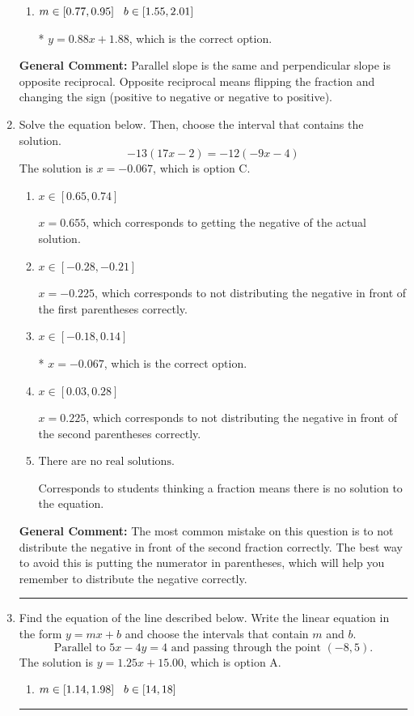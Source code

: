 \documentclass{extbook}[14pt]
\newcommand{\litem}[1]{\item #1

\rule{\textwidth}{0.4pt}}
\begin{document}
\begin{enumerate}
{\begin{enumerate}[label=\Alph*.]
 $y = -0.88x + 14.12$, which corresponds to using the negative slope.
\item \( m \in [0.77, 0.95] \hspace*{3mm} b \in [1.55, 2.01] \)

* $y = 0.88x + 1.88$, which is the correct option.
\end{enumerate}

\textbf{General Comment:} Parallel slope is the same and perpendicular slope is opposite reciprocal. Opposite reciprocal means flipping the fraction and changing the sign (positive to negative or negative to positive).
}
\litem{
Solve the equation below. Then, choose the interval that contains the solution.
\[ -13(17x -2) = -12(-9x -4) \]The solution is \( x = -0.067 \), which is option C.\begin{enumerate}[label=\Alph*.]
\item \( x \in [0.65, 0.74] \)

$x = 0.655$, which corresponds to getting the negative of the actual solution.
\item \( x \in [-0.28, -0.21] \)

$x = -0.225$, which corresponds to not distributing the negative in front of the first parentheses correctly.
\item \( x \in [-0.18, 0.14] \)

* $x = -0.067$, which is the correct option.
\item \( x \in [0.03, 0.28] \)

$x = 0.225$, which corresponds to not distributing the negative in front of the second parentheses correctly.
\item \( \text{There are no real solutions.} \)

Corresponds to students thinking a fraction means there is no solution to the equation.
\end{enumerate}

\textbf{General Comment:} The most common mistake on this question is to not distribute the negative in front of the second fraction correctly. The best way to avoid this is putting the numerator in parentheses, which will help you remember to distribute the negative correctly.
}
\litem{
Find the equation of the line described below. Write the linear equation in the form $ y=mx+b $ and choose the intervals that contain $m$ and $b$.
\[ \text{Parallel to } 5 x - 4 y = 4 \text{ and passing through the point } (-8, 5). \]The solution is \( y = 1.25x + 15.00 \), which is option A.\begin{enumerate}[label=\Alph*.]
\item \( m \in [1.14, 1.98] \hspace*{3mm} b \in [14, 18] \)


\end{enumerate}}
\end{enumerate}
\end{document}
